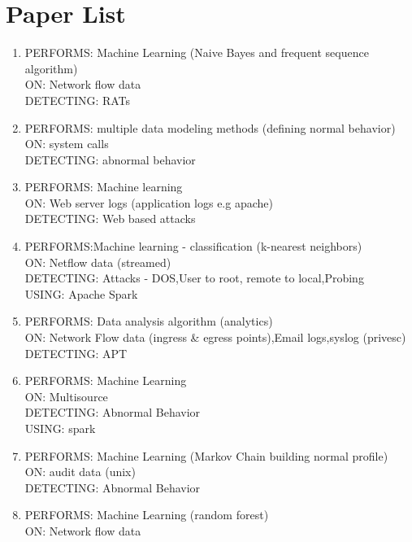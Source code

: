 \documentclass[conference]{IEEEtran}
\begin{document}
\section{Paper List}
\begin{enumerate}
    \item 
    PERFORMS: Machine Learning (Naive Bayes and frequent sequence algorithm) \\ 
    ON: Network flow data\\ 
    DETECTING: RATs 
    \cite{wu2017detecting} 
    \item 
    PERFORMS: multiple data modeling methods (defining normal behavior)\\ 
    ON: system calls\\ 
    DETECTING: abnormal behavior 
    \cite{warrender1999detecting}
    \item  
    PERFORMS: Machine learning\\ 
    ON: Web server logs (application logs e.g apache)\\ DETECTING: Web based attacks 
    \cite{kruegel2003anomaly}
    \item 
    PERFORMS:Machine learning - classification (k-nearest neighbors)\\ 
    ON: Netflow data (streamed)\\ 
    DETECTING: Attacks - DOS,User to root, remote to local,Probing\\ 
    USING: Apache Spark 
    \cite{thevar2017effect} 
    \item 
    PERFORMS: Data analysis algorithm (analytics)\\ 
    ON: Network Flow data (ingress \& egress points),Email logs,syslog (privesc)\\ 
    DETECTING: APT \cite{kim2013detection} 
    \item 
    PERFORMS: Machine Learning\\ 
    ON: Multisource\\ 
    DETECTING: Abnormal Behavior\\ 
    USING: spark 
    \cite{jia2017big} 
    \item 
    PERFORMS: Machine Learning (Markov Chain building normal profile)\\ 
    ON: audit data (unix)\\ 
    DETECTING: Abnormal Behavior \cite{ye2004robustness}
    \item 
    PERFORMS: Machine Learning (random forest)\\ 
    ON: Network flow data\\ 

\end{enumerate}
\end{document}
